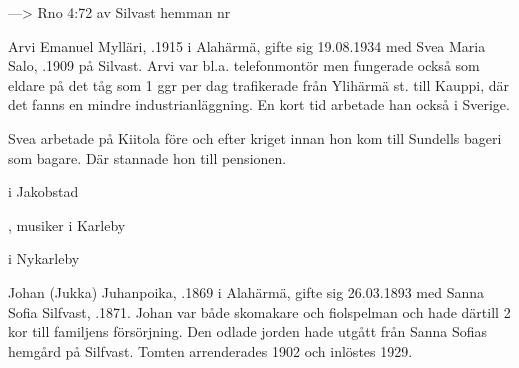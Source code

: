 \begin{jhchildren}
  \item {}
  \item {}
\end{jhchildren}



---> Rno 4:72 av Silvast hemman nr 


Arvi Emanuel Mylläri, .1915 i Alahärmä, gifte sig 19.08.1934 med Svea Maria Salo, .1909 på Silvast. Arvi var bl.a. telefonmontör men fungerade också som eldare på det tåg som 1 ggr per dag trafikerade från Ylihärmä st. till Kauppi, där det fanns en mindre industrianläggning. En kort tid arbetade han också i Sverige.

Svea arbetade på Kiitola före och efter kriget innan hon kom till Sundells bageri som bagare. Där stannade hon till pensionen.
\begin{jhchildren}
  \item {} i Jakobstad
  \item {}, musiker i Karleby
  \item {} i Nykarleby
\end{jhchildren}


Johan (Jukka) Juhanpoika, .1869 i Alahärmä, gifte sig 26.03.1893 med Sanna Sofia Silfvast, .1871. Johan var både skomakare och fiolspelman och hade därtill 2 kor till familjens försörjning. Den odlade jorden hade utgått från Sanna Sofias hemgård på Silfvast. Tomten arrenderades 1902 och inlöstes 1929.
\begin{jhchildren}
  \item {}
  \item {}
  \item {}
  \item {}
  \item {}
  \item {}
\end{jhchildren}



